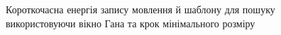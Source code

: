         \begin{figure}[h]
            \centering

            \caption{Короткочасна енергія запису мовлення й шаблону для пошуку використовуючи вікно Гана та крок
                мінімального розміру}
            \label{fig:audio-energy-han-min}
        \end{figure}

